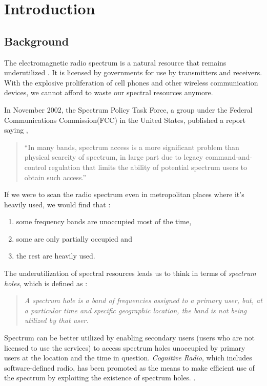 \chapter{Introduction}
\section{Background}
The electromagnetic radio spectrum is a natural resource that remains underutilized \cite{haykin05}. It is licensed by governments for use by transmitters and receivers. With the explosive proliferation of cell phones and other wireless communication devices, we cannot afford to waste our spectral resources anymore.

In November 2002, the Spectrum Policy Task Force, a group under the Federal Communications Commission(FCC) in the United States, published a report saying \cite{repFCC}, 
\begin{quote}
``In many bands, spectrum access is a more significant problem than physical scarcity of spectrum, in large part due to legacy command-and-control regulation that limits the ability of potential spectrum users to obtain such access.''
\end{quote}

If we were to scan the radio spectrum even in metropolitan places where it's heavily used, we would find that \cite{staple04} :
\begin{enumerate}
	\item some frequency bands are unoccupied most of the time,
	\item some are only partially occupied and
	\item the rest are heavily used.
\end{enumerate}

The underutilization of spectral resources leads us to think in terms of \emph{spectrum holes}, which is defined as \cite{kolodzy01}:
\begin{quote}
\emph{A spectrum hole is a band of frequencies assigned to a primary user, but, at a particular time and specific geographic location, the band is not being utilized by that user.
}
\end{quote}

Spectrum can be better utilized by enabling secondary users (users who are not licensed to use the services) to access spectrum holes unoccupied by primary users at the location and the time in question. \emph{Cognitive Radio}, which includes software-defined radio, has been promoted as the means to make efficient use of the spectrum by exploiting the existence of spectrum holes. \cite{haykin05}\cite{mitola99}.

